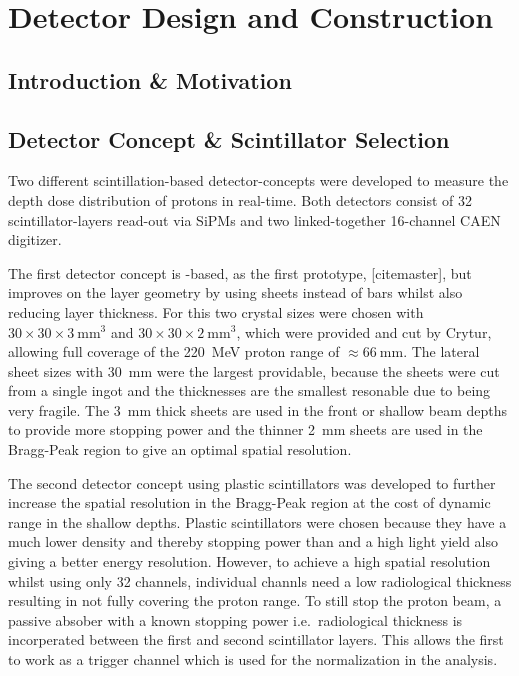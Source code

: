 \chapter{Detector Design and Construction}\label{chapter:setup}

\section{Introduction \& Motivation}

\section{Detector Concept \& Scintillator Selection}\label{section:detector:concept}
Two different scintillation-based detector-concepts were developed to measure the depth dose distribution of protons in real-time.
Both detectors consist of 32 scintillator-layers read-out via \glspl{SiPM} and two linked-together 16-channel CAEN digitizer.

The first detector concept is -based, as the first prototype,  [citemaster], but improves on the layer geometry by using sheets instead of bars whilst also reducing layer thickness.
For this two crystal sizes were chosen with $30\times30\times3~\text{mm}^3$ and $30\times30\times2~\text{mm}^3$, which were provided and cut by Crytur, allowing full coverage of the \SI{220}{\mega\electronvolt} proton range of $\approx \SI{66}{\mm}$.
The lateral sheet sizes with \SI{30}{\mm} were the largest providable, because the sheets were cut from a single ingot and the thicknesses are the smallest resonable due to  being very fragile.
The \SI{3}{\mm} thick sheets are used in the front or shallow beam depths to provide more stopping power and the thinner \SI{2}{\mm} sheets are used in the Bragg-Peak region to give an optimal spatial resolution.

The second detector concept using plastic scintillators was developed to further increase the spatial resolution in the Bragg-Peak region at the cost of dynamic range in the shallow depths. 
Plastic scintillators were chosen because they have a much lower density and thereby stopping power than  and a high light yield also giving a better energy resolution.
However, to achieve a high spatial resolution whilst using only 32 channels, individual channls need a low radiological thickness resulting in not fully covering the proton range.
To still stop the proton beam, a passive absober with a known stopping power i.e.~radiological thickness is incorperated between the first and second scintillator layers.
This allows the first to work as a trigger channel which is used for the normalization in the analysis.


